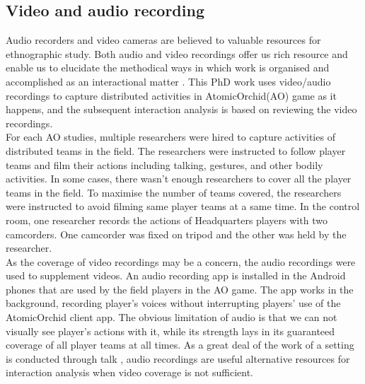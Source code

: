 \subsection{Video and audio recording}
Audio recorders and video cameras are believed to valuable resources for ethnographic study. Both audio and video recordings offer us rich resource and enable us to elucidate the methodical ways in which work is organised and accomplished as an interactional matter \cite{Crabtree2012}. This PhD work uses video/audio recordings to capture distributed activities in AtomicOrchid(AO) game as it happens, and the subsequent interaction analysis is based on reviewing the video recordings. \\

For each \ac{AO} studies, multiple researchers were hired to capture activities of distributed teams in the field. The researchers were instructed to follow player teams and film their actions including talking, gestures, and other bodily activities. In some cases, there wasn't enough researchers to cover all the player teams in the field. To maximise the number of teams covered, the researchers were instructed to avoid filming same player teams at a same time. In the control room, one researcher records the actions of Headquarters players with two camcorders. One camcorder was fixed on tripod and the other was held by the researcher. \\

As the coverage of video recordings may be a concern, the audio recordings were used to supplement videos. An audio recording app is installed in the Android phones that are used by the field players in the AO game. The app works in the background, recording player's voices without interrupting players' use of the AtomicOrchid client app. The obvious limitation of audio is that we can not visually see player's actions with it, while its strength lays in its guaranteed coverage of all player teams at all times. As a great deal of the work of a setting is conducted through talk \cite{Crabtree2012}, audio recordings are useful alternative resources for interaction analysis when video coverage is not sufficient. \\


